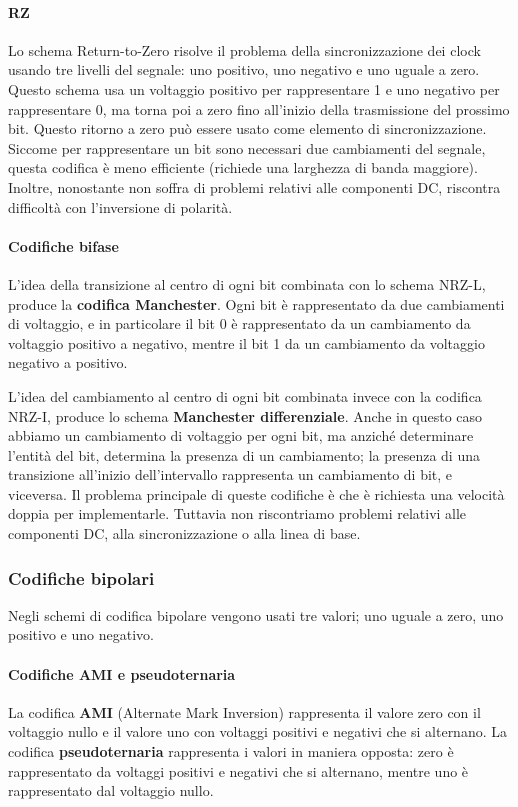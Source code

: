             \paragraph{RZ} Lo schema Return-to-Zero risolve il problema della sincronizzazione dei clock usando tre livelli del segnale: uno positivo, uno negativo e uno uguale a zero. Questo schema usa un voltaggio positivo per rappresentare 1 e uno negativo per rappresentare 0, ma torna poi a zero fino all'inizio della trasmissione del prossimo bit. Questo ritorno a zero può essere usato come elemento di sincronizzazione. Siccome per rappresentare un bit sono necessari due cambiamenti del segnale, questa codifica è meno efficiente (richiede una larghezza di banda maggiore). Inoltre, nonostante non soffra di problemi relativi alle componenti DC, riscontra difficoltà con l'inversione di polarità.
            
            \paragraph{Codifiche bifase} L'idea della transizione al centro di ogni bit combinata con lo schema NRZ-L, produce la \textbf{codifica Manchester}. Ogni bit è rappresentato da due cambiamenti di voltaggio, e in particolare il bit 0 è rappresentato da un cambiamento da voltaggio positivo a negativo, mentre il bit 1 da un cambiamento da voltaggio negativo a positivo.
            
            L'idea del cambiamento al centro di ogni bit combinata invece con la codifica NRZ-I, produce lo schema \textbf{Manchester differenziale}. Anche in questo caso abbiamo un cambiamento di voltaggio per ogni bit, ma anziché determinare l'entità del bit, determina la presenza di un cambiamento; la presenza di una transizione all'inizio dell'intervallo rappresenta un cambiamento di bit, e viceversa. Il problema principale di queste codifiche è che è richiesta una velocità doppia per implementarle. Tuttavia non riscontriamo problemi relativi alle componenti DC, alla sincronizzazione o alla linea di base.
            
        \subsubsection{Codifiche bipolari}
            Negli schemi di codifica bipolare vengono usati tre valori; uno uguale a zero, uno positivo e uno negativo.
            
            \paragraph{Codifiche AMI e pseudoternaria} La codifica \textbf{AMI} (Alternate Mark Inversion) rappresenta il valore zero con il voltaggio nullo e il valore uno con voltaggi positivi e negativi che si alternano. La codifica \textbf{pseudoternaria} rappresenta i valori in maniera opposta: zero è rappresentato da voltaggi positivi e negativi che si alternano, mentre uno è rappresentato dal voltaggio nullo.
            
